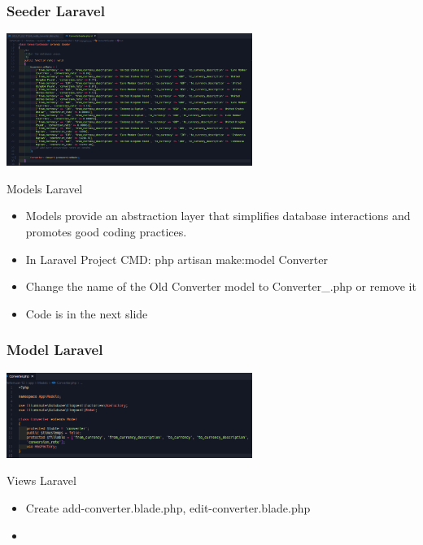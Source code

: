 \documentclass[aspectratio=169, table]{beamer}
\begin{document}
\begin{frame}[fragile]
 \frametitle{Seeder Laravel}
 \vskip1cm
 \begin{center}
  \includegraphics[width=0.6\textwidth]{classFiles/pertemuan-12-seeder.png}
 \end{center}
\end{frame}

\begin{frame}{Models Laravel}
    \vskip1cm
    \begin{itemize}
        \item Models provide an abstraction layer that simplifies database interactions and promotes good coding practices.
        \item In Laravel Project CMD: php artisan make:model Converter
        \item Change the name of the Old Converter model to Converter\_.php or remove it
        \item Code is in the next slide
    \end{itemize}
\end{frame}

\begin{frame}[fragile]
 \frametitle{Model Laravel}
 \vskip1cm
 \begin{center}
  \includegraphics[width=0.6\textwidth]{classFiles/pertemuan-12-model.png}
 \end{center}
\end{frame}

\begin{frame}{Views Laravel}
    \vskip1cm
    \begin{itemize}
        \item Create add-converter.blade.php, edit-converter.blade.php
        \item 
    \end{itemize}
\end{frame}
\end{document}
